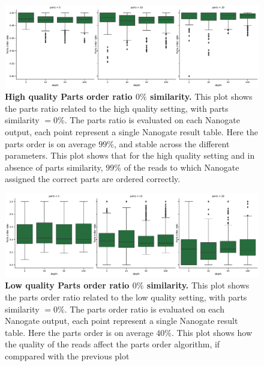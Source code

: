 \documentclass[11pt, a4paper]{article}
\begin{document}
\begin{figure}[ht]
    \begin{center}
    \includegraphics[width=1.35\textwidth]{../results/images_notebook/v_500/hq_sim_00_parts_order_ratio.pdf}
    \end{center}
    \caption{{\bf High quality Parts order ratio $0\%$ similarity.} This plot shows the parts ratio related to the high quality setting, with parts similarity $=0\%$. The parts ratio is evaluated on each  Nanogate output, each point represent a single Nanogate result table. Here the parts order is on average $99\%$, and stable across the different parameters. This plot shows that for the high quality setting and in absence of parts similarity, $99\%$ of the reads to which Nanogate assigned the correct parts are ordered correctly.}
   \label{fig:v_500_hq_sim_00_parts_order_ratio}
\end{figure}



\begin{figure}[ht]
    \begin{center}
    \includegraphics[width=1.35\textwidth]{../results/images_notebook/v_500/lq_sim_00_parts_order_ratio.pdf}
    \end{center}
    \caption{{\bf Low quality Parts order ratio $0\%$ similarity.} This plot shows the parts order ratio related to the low quality setting, with parts similarity $=0\%$. The parts order ratio is evaluated on each  Nanogate output, each point represent a single Nanogate result table. Here the parts order is on average $40\%$. This plot shows how the quality of the reads affect the parts order algorithm, if comppared with the previous plot}
   \label{fig:v_500_lq_sim_00_parts_order_ratio}
\end{figure}
\end{document}
